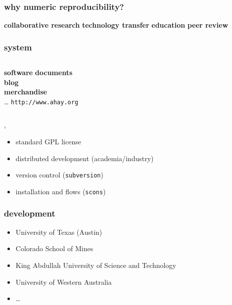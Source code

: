 \begin{frame} \frametitle{why numeric reproducibility?}

  \vfill
  \textbf{collaborative research} 
  \vfill
  \textbf{technology transfer}
  \vfill
  \textbf{education}
  \vfill
  \textbf{peer review}
  \vfill
  
\end{frame}
\cwpnote{}


\begin{frame} \frametitle{\mg system}

  \begin{columns}
    \textbf{software}
    \textbf{documents} \\
    \textbf{blog} \\
    \textbf{merchandise} \\
    \dots  
    \alert{ \texttt{http://www.ahay.org} }
  \end{columns}
  
  \sep
  
  \begin{itemize}
  \item standard GPL license
  \item distributed development (academia/industry)
  \item version control (\texttt{subversion})
  \item installation and flows (\texttt{scons})
  \end{itemize}
  
\end{frame}
\cwpnote{}


\begin{frame} \frametitle{\mg development}

  \begin{itemize}
  \item University of Texas (Austin)
  \item Colorado School of Mines
  \item King Abdullah University of Science and Technology
  \item University of Western Australia
  \item \dots
  \end{itemize}
  
\end{frame}
\cwpnote{}


